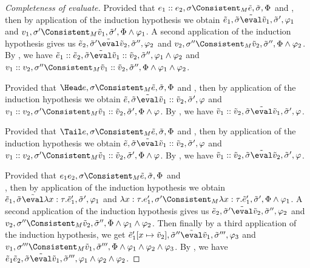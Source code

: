 \begin{proof}[Completeness of evaluate]
    {
    Provided that $e_1:: e_2,\sigma\Consistent_M \tilde{e},\tilde{\sigma},\Phi$ and ,
    then by application of the induction hypothesis we obtain $\tilde{e}_1,\tilde{\sigma}\tilde{\eval}\tilde{v}_1,\tilde{\sigma}',\phi_1$
    and $v_1,\sigma'\Consistent_M \tilde{v}_1,\tilde{\sigma}',\Phi\land\phi_1$.
    A second application of the induction hypothesis gives us  $\tilde{e}_2,\tilde{\sigma}'\tilde{\eval}\tilde{v}_2,\tilde{\sigma}'',\phi_2$
    and $v_2,\sigma''\Consistent_M \tilde{v}_2,\tilde{\sigma}'',\Phi\land\phi_2$.
    By , we have $\tilde{e}_1 :: \tilde{e}_2,\tilde{\sigma}\tilde{\eval}\tilde{v}_1::\tilde{v}_2,\tilde{\sigma}'',\phi_1\land\phi_2$ and $v_1::v_2,\sigma''\Consistent_M \tilde{v}_1::\tilde{v}_2,\tilde{\sigma}'',\Phi\land\phi_1\land\phi_2$.
   }

    {
    Provided that $\Head e,\sigma\Consistent_M \tilde{e},\tilde{\sigma},\Phi$ and ,
    then by application of the induction hypothesis we obtain $\tilde{e},\tilde{\sigma}\tilde{\eval}\tilde{v}_1 :: \tilde{v}_2,\tilde{\sigma}',\phi$
    and $v_1::v_2,\sigma'\Consistent_M \tilde{v}_1 :: \tilde{v}_2,\tilde{\sigma}',\Phi\land\phi$.
    By , we have $\tilde{v}_1 :: \tilde{v}_2,\tilde{\sigma}\tilde{\eval}\tilde{v}_1,\tilde{\sigma}',\phi$.
    }

    {
    Provided that $\Tail e,\sigma\Consistent_M \tilde{e},\tilde{\sigma},\Phi$ and ,
    then by application of the induction hypothesis we obtain $\tilde{e},\tilde{\sigma}\tilde{\eval}\tilde{v}_1 :: \tilde{v}_2,\tilde{\sigma}',\phi$
    and $v_1::v_2,\sigma'\Consistent_M \tilde{v}_1 :: \tilde{v}_2,\tilde{\sigma}',\Phi\land\phi$.
    By , we have $\tilde{v}_1 :: \tilde{v}_2,\tilde{\sigma}\tilde{\eval}\tilde{v}_2,\tilde{\sigma}',\phi$.
      }

    {

    Provided that $e_1 e_2,\sigma\Consistent_M \tilde{e},\tilde{\sigma},\Phi$ and\\
    ,
    then by application of the induction hypothesis we obtain $\tilde{e}_1,\tilde{\sigma}\tilde{\eval}\lambda x:\tau .\tilde{e}_1',\tilde{\sigma}',\phi_1$
    and $\lambda x:\tau .e_1',\sigma'\Consistent_M \lambda x:\tau .\tilde{e}_1',\tilde{\sigma}',\Phi\land\phi_1$.
    A second application of the induction hypothesis gives us  $\tilde{e}_2,\tilde{\sigma}'\tilde{\eval}\tilde{v}_2,\tilde{\sigma}'',\phi_2$
    and $v_2,\sigma''\Consistent_M \tilde{v}_2,\tilde{\sigma}'',\Phi\land\phi_1\land\phi_2$.
    Then finally by a third application of the induction hypothesis, we get  $\tilde{e}_1'[x\mapsto \tilde{v}_2],\tilde{\sigma}''\tilde{\eval}\tilde{v}_1,\tilde{\sigma}''',\phi_3$
    and $v_1,\sigma'''\Consistent_M \tilde{v}_1,\tilde{\sigma}''',\Phi\land\phi_1\land\phi_2\land\phi_3$.
    By , we have $\tilde{e}_1 \tilde{e}_2,\tilde{\sigma}\tilde{\eval}\tilde{v}_1,\tilde{\sigma}''',\phi_1\land\phi_2\land\phi_2$.
    }


\end{proof}
